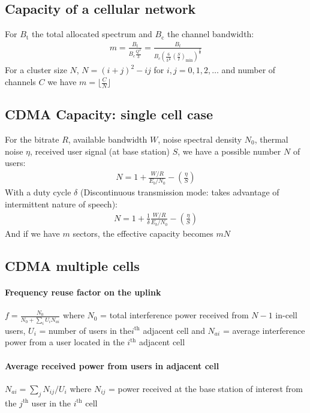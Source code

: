 \documentclass[10pt, a4paper,twocolumn]{scrartcl}
\begin{document}
\subsection{Capacity of a cellular network}
For $B_\textrm{t}$ the total allocated spectrum and $B_\textrm{c}$ the channel bandwidth: 
\begin{align*}
m = \frac{B_t}{B_c \frac{Q^2}{3}} = \frac{B_t}{B_c\left(\frac{6}{3^{\frac{\alpha}{2}}}\left(\frac{S}{I}\right)_\textrm{min}\right)^{\frac{2}{\alpha}}}
\end{align*}
For a cluster size $N$, $N = (i + j)^2 - ij$ for $i,j=0,1,2,\ldots$ and number of channels $C$ we have $m=\lfloor\frac CN\rfloor$

\subsection{CDMA Capacity: single cell case}
For the bitrate $R$, available bandwidth $W$, noise spectral density $N_0$, thermal noise $\eta$, received user signal (at base station) $S$, we have a possible number $N$ of users:
\begin{align*}
	N = 1 + \frac{W/R}{E_b/N_0} - (\frac{\eta}{S})
\end{align*}
With a duty cycle $\delta$ (Discontinuous transmission mode: takes advantage of
intermittent nature of speech):
\begin{align*}
	N = 1 + \frac1\delta\frac{W/R}{E_b/N_0} - (\frac{\eta}{S})
\end{align*}
And if we have $m$ sectors, the effective capacity becomes $mN$
\subsection{CDMA multiple cells}
\paragraph{Frequency reuse factor on the uplink} 
$f = \frac{N_0}{N_0 + \sum_iU_iN_{ai}}$ where $N_0$ = total interference power received from $N-1$ in-cell users, $U_i$ = number of users in the$i^\text{th}$ adjacent cell and $N_{ai}$ = average interference power from a user located in the $i^\text{th}$ adjacent cell

\paragraph{Average received power from users in adjacent cell}
$N_{ai} = \sum_j N_{ij}/U_i$ where $N_{ij}$ = power received at the base station of interest from the $j^\text{th}$ user in the $i^\text{th}$ cell
\end{document}
